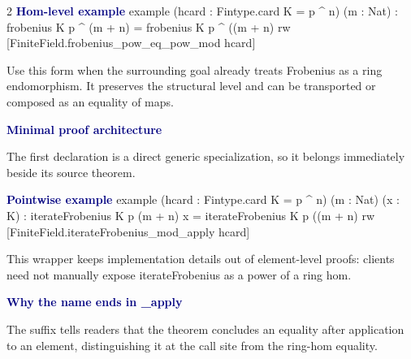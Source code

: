 \documentclass[10pt]{article}
\newenvironment{lean}{\Verbatim[fontsize=\small,frame=single,framesep=1.8mm,rulecolor=\color{blue!45},formatcom=\leanfont]}{\endVerbatim}
\newcommand{\code}[1]{{\leanfont #1}}
\newcommand{\decision}[1]{\textcolor{navy}{\bfseries #1}}
\begin{document}
\begin{multicols}{2}
\decision{Hom-level example}
\begin{lean}
example (hcard : Fintype.card K = p ^ n)
    (m : Nat) :
    frobenius K p ^ (m + n) =
      frobenius K p ^ ((m + n) %
  rw [FiniteField.frobenius_pow_eq_pow_mod hcard]
\end{lean}

Use this form when the surrounding goal already treats Frobenius as a ring endomorphism.  It preserves the structural level and can be transported or composed as an equality of maps.

\decision{Minimal proof architecture}
\begin{center}
\end{center}
The first declaration is a direct generic specialization, so it belongs immediately beside its source theorem.

\columnbreak
\decision{Pointwise example}
\begin{lean}
example (hcard : Fintype.card K = p ^ n)
    (m : Nat) (x : K) :
    iterateFrobenius K p (m + n) x =
      iterateFrobenius K p ((m + n) %
  rw [FiniteField.iterateFrobenius_mod_apply hcard]
\end{lean}

This wrapper keeps implementation details out of element-level proofs: clients need not manually expose \code{iterateFrobenius} as a power of a ring hom.

\decision{Why the name ends in \code{\_apply}}
\begin{center}
\end{center}
The suffix tells readers that the theorem concludes an equality after application to an element, distinguishing it at the call site from the ring-hom equality.
\end{multicols}
\end{document}
